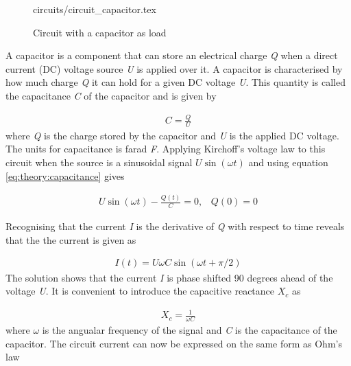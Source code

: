 \documentclass[class=book, crop=false]{standalone}
\begin{document}
\begin{figure}[ht!]
    \center
    {circuits/circuit_capacitor.tex}
    \caption[size = 9]
    {Circuit with a capacitor as load}\label{fig:theory:circuit_capacitor}
\end{figure}



A capacitor is a component that can store an electrical charge \textit{Q} when a direct current (DC) voltage source \textit{U} is applied over it. A capacitor is characterised by how much charge \textit{Q} it can hold for a given DC voltage \textit{U}. This quantity is called the capacitance \textit{C} of the capacitor and is given by 

\begin{equation}
   \begin{aligned}\label{eq:theory:capacitance}
C = \frac{Q}{U}
\end{aligned} 
\end{equation}
where \textit{Q} is the charge stored by the capacitor and \textit{U} is the applied DC voltage. The units for capacitance is farad \textit{F}. Applying Kirchoff's voltage law to this circuit when the source is a sinusoidal signal $U\sin(\omega t)$ and using equation \eqref{eq:theory:capacitance} gives



\begin{equation}
   \begin{aligned}\label{eq:theory:capacitance_diffeq}
U\sin{(\omega t)} - \frac{Q(t)}{C} = 0, \;\;\; Q(0) = 0
\end{aligned} 
\end{equation}

Recognising that the current \textit{I} is the derivative of \textit{Q} with respect to time reveals that the the current is given as

\begin{equation}
   \begin{aligned}\label{eq:theory:capacitance_diffeq_solved}
I(t) = U\omega C \sin{(\omega t + \pi/2)}
\end{aligned} 
\end{equation}
The solution shows that the current \textit{I} is phase shifted 90 degrees ahead of the voltage \textit{U}. It is convenient to introduce the capacitive reactance $X_{c}$ as



\begin{equation}
   \begin{aligned}\label{eq:theory:reactance_capacitive}
X_{c} = \frac{1}{\omega C}
\end{aligned} 
\end{equation}
where $\omega$ is the angualar frequency of the signal and \textit{C} is the capacitance of the capacitor. The circuit current can now be expressed on the same form as Ohm's law
\end{document}
